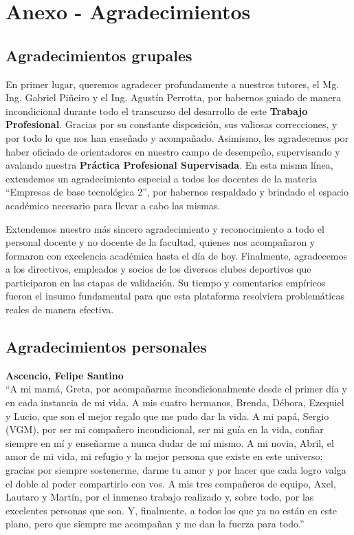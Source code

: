 \section{Anexo - Agradecimientos}

\subsection{Agradecimientos grupales}

En primer lugar, queremos agradecer profundamente a nuestros tutores, el Mg. Ing. Gabriel Piñeiro y el Ing. Agustín Perrotta, por habernos guiado de manera incondicional durante todo el transcurso del desarrollo de este \textbf{Trabajo Profesional}. Gracias por su constante disposición, sus valiosas correcciones, y por todo lo que nos han enseñado y acompañado. Asimismo, les agradecemos por haber oficiado de orientadores en nuestro campo de desempeño, supervisando y avalando nuestra \textbf{Práctica Profesional Supervisada}. En esta misma línea, extendemos un agradecimiento especial a todos los docentes de la materia ``Empresas de base tecnológica 2'', por habernos respaldado y brindado el espacio académico necesario para llevar a cabo las mismas.

Extendemos nuestro más sincero agradecimiento y reconocimiento a todo el personal docente y no docente de la facultad, quienes nos acompañaron y formaron con excelencia académica hasta el día de hoy. Finalmente, agradecemos a los directivos, empleados y socios de los diversos clubes deportivos que participaron en las etapas de validación. Su tiempo y comentarios empíricos fueron el insumo fundamental para que esta plataforma resolviera problemáticas reales de manera efectiva.

\subsection{Agradecimientos personales}

\noindent \textbf{Ascencio, Felipe Santino} \\
``A mi mamá, Greta, por acompañarme incondicionalmente desde el primer día y en cada instancia de mi vida. A mis cuatro hermanos, Brenda, Débora, Ezequiel y Lucio, que son el mejor regalo que me pudo dar la vida. A mi papá, Sergio (VGM), por ser mi compañero incondicional, ser mi guía en la vida, confiar siempre en mí y enseñarme a nunca dudar de mí mismo. A mi novia, Abril, el amor de mi vida, mi refugio y la mejor persona que existe en este universo; gracias por siempre sostenerme, darme tu amor y por hacer que cada logro valga el doble al poder compartirlo con vos. A mis tres compañeros de equipo, Axel, Lautaro y Martín, por el inmenso trabajo realizado y, sobre todo, por las excelentes personas que son. Y, finalmente, a todos los que ya no están en este plano, pero que siempre me acompañan y me dan la fuerza para todo.''

